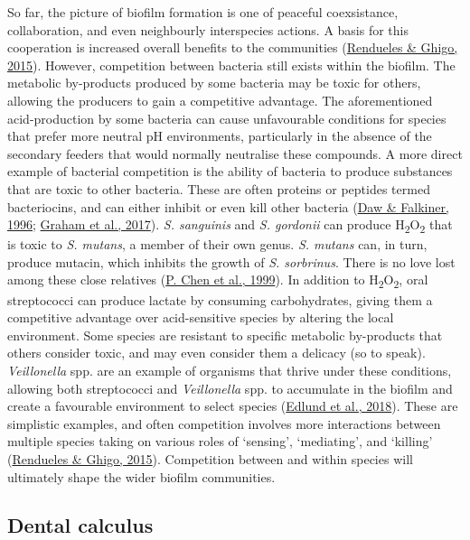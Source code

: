 \documentclass[
  letterpaper,
]{book}
\begin{document}
So far, the picture of biofilm formation is one of peaceful
coexsistance, collaboration, and even neighbourly interspecies actions.
A basis for this cooperation is increased overall benefits to the
communities
(\protect\hyperlink{ref-renduelesMechanismsCompetition2015}{Rendueles \&
Ghigo, 2015}). However, competition between bacteria still exists within
the biofilm. The metabolic by-products produced by some bacteria may be
toxic for others, allowing the producers to gain a competitive
advantage. The aforementioned acid-production by some bacteria can cause
unfavourable conditions for species that prefer more neutral pH
environments, particularly in the absence of the secondary feeders that
would normally neutralise these compounds. A more direct example of
bacterial competition is the ability of bacteria to produce substances
that are toxic to other bacteria. These are often proteins or peptides
termed bacteriocins, and can either inhibit or even kill other bacteria
(\protect\hyperlink{ref-dawBacteriocinsNature1996}{Daw \& Falkiner,
1996}; \protect\hyperlink{ref-grahamEnterococcusFaecalis2017}{Graham et
al., 2017}). \emph{S. sanguinis} and \emph{S. gordonii} can produce
H\textsubscript{2}O\textsubscript{2} that is toxic to \emph{S. mutans},
a member of their own genus. \emph{S. mutans} can, in turn, produce
mutacin, which inhibits the growth of \emph{S. sorbrinus}. There is no
love lost among these close relatives
(\protect\hyperlink{ref-chenSpecificGenes1999}{P. Chen et al., 1999}).
In addition to H\textsubscript{2}O\textsubscript{2}, oral streptococci
can produce lactate by consuming carbohydrates, giving them a
competitive advantage over acid-sensitive species by altering the local
environment. Some species are resistant to specific metabolic
by-products that others consider toxic, and may even consider them a
delicacy (so to speak). \emph{Veillonella} spp. are an example of
organisms that thrive under these conditions, allowing both streptococci
and \emph{Veillonella} spp. to accumulate in the biofilm and create a
favourable environment to select species
(\protect\hyperlink{ref-edlundUncoveringComplex2018}{Edlund et al.,
2018}). These are simplistic examples, and often competition involves
more interactions between multiple species taking on various roles of
`sensing', `mediating', and `killing'
(\protect\hyperlink{ref-renduelesMechanismsCompetition2015}{Rendueles \&
Ghigo, 2015}). Competition between and within species will ultimately
shape the wider biofilm communities.

\hypertarget{dental-calculus}{%
\subsection{Dental calculus}\label{dental-calculus}}
\end{document}
